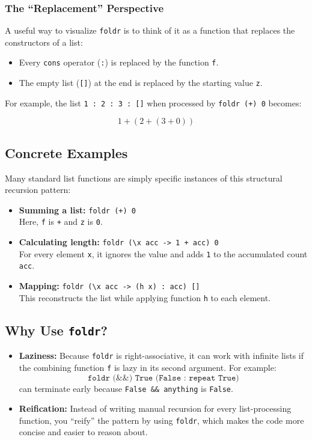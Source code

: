\documentclass[12pt]{article}
\begin{document}
\subsubsection{The ``Replacement'' Perspective}
A useful way to visualize \texttt{foldr} is to think of it as a function that replaces the constructors of a list:

\begin{itemize}
    \item Every \texttt{cons} operator (\texttt{:}) is replaced by the function \texttt{f}.
    \item The empty list (\texttt{[]}) at the end is replaced by the starting value \texttt{z}.
\end{itemize}

For example, the list \texttt{1 : 2 : 3 : []} when processed by \texttt{foldr (+) 0} becomes:

\[
    1 + (2 + (3 + 0))
\]

\subsection{Concrete Examples}
Many standard list functions are simply specific instances of this structural recursion pattern:

\begin{itemize}
    \item \textbf{Summing a list:} \texttt{foldr (+) 0} \\
          Here, \texttt{f} is \texttt{+} and \texttt{z} is \texttt{0}.

    \item \textbf{Calculating length:} \texttt{foldr (\textbackslash x acc -> 1 + acc) 0} \\
          For every element \texttt{x}, it ignores the value and adds \texttt{1} to the accumulated count \texttt{acc}.

    \item \textbf{Mapping:} \texttt{foldr (\textbackslash x acc -> (h x) : acc) []} \\
          This reconstructs the list while applying function \texttt{h} to each element.
\end{itemize}

\subsection{Why Use \texttt{foldr}?}
\begin{itemize}
    \item \textbf{Laziness:} Because \texttt{foldr} is right-associative, it can work with infinite lists if the combining function \texttt{f} is lazy in its second argument. For example:
          \[
              \texttt{foldr (\&\&) True (False : repeat True)}
          \]
          can terminate early because \texttt{False \&\& anything} is \texttt{False}.

    \item \textbf{Reification:} Instead of writing manual recursion for every list-processing function, you ``reify'' the pattern by using \texttt{foldr}, which makes the code more concise and easier to reason about.
\end{itemize}
\end{document}
